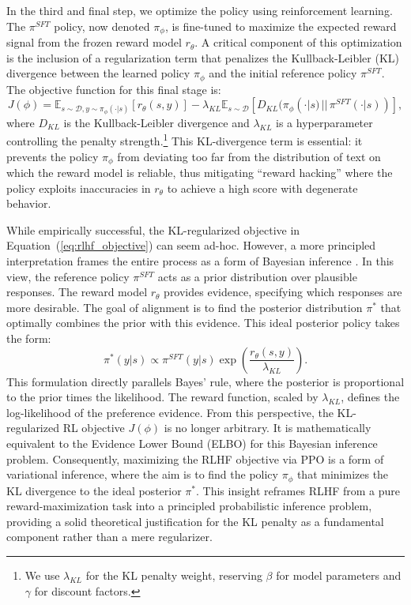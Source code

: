 In the third and final step, we optimize the policy using reinforcement learning. The $\pi^{SFT}$ policy, now denoted $\pi_\phi$, is fine-tuned to maximize the expected reward signal from the frozen reward model $r_\theta$. A critical component of this optimization is the inclusion of a regularization term that penalizes the Kullback-Leibler (KL) divergence between the learned policy $\pi_\phi$ and the initial reference policy $\pi^{SFT}$. The objective function for this final stage is:
\begin{equation}
    J(\phi) = \mathbb{E}_{s \sim \mathcal{D}, y \sim \pi_\phi(\cdot|s)} [r_\theta(s, y)] - \lambda_{KL} \mathbb{E}_{s \sim \mathcal{D}} [D_{KL}(\pi_\phi(\cdot|s) \,||\, \pi^{SFT}(\cdot|s))],
\label{eq:rlhf_objective}
\end{equation}
where $D_{KL}$ is the Kullback-Leibler divergence and $\lambda_{KL}$ is a hyperparameter controlling the penalty strength.\footnote{We use $\lambda_{KL}$ for the KL penalty weight, reserving $\beta$ for model parameters and $\gamma$ for discount factors.} This KL-divergence term is essential: it prevents the policy $\pi_\phi$ from deviating too far from the distribution of text on which the reward model is reliable, thus mitigating ``reward hacking'' where the policy exploits inaccuracies in $r_\theta$ to achieve a high score with degenerate behavior.

While empirically successful, the KL-regularized objective in Equation~(\ref{eq:rlhf_objective}) can seem ad-hoc. However, a more principled interpretation frames the entire process as a form of Bayesian inference \citep{korbak2022rl}. In this view, the reference policy $\pi^{SFT}$ acts as a prior distribution over plausible responses. The reward model $r_\theta$ provides evidence, specifying which responses are more desirable. The goal of alignment is to find the posterior distribution $\pi^*$ that optimally combines the prior with this evidence. This ideal posterior policy takes the form:
\begin{equation}
    \pi^*(y|s) \propto \pi^{SFT}(y|s) \exp\left(\frac{r_\theta(s, y)}{\lambda_{KL}}\right).
\label{eq:rlhf_posterior}
\end{equation}
This formulation directly parallels Bayes' rule, where the posterior is proportional to the prior times the likelihood. The reward function, scaled by $\lambda_{KL}$, defines the log-likelihood of the preference evidence. From this perspective, the KL-regularized RL objective $J(\phi)$ is no longer arbitrary. It is mathematically equivalent to the Evidence Lower Bound (ELBO) for this Bayesian inference problem. Consequently, maximizing the RLHF objective via PPO is a form of variational inference, where the aim is to find the policy $\pi_\phi$ that minimizes the KL divergence to the ideal posterior $\pi^*$. This insight reframes RLHF from a pure reward-maximization task into a principled probabilistic inference problem, providing a solid theoretical justification for the KL penalty as a fundamental component rather than a mere regularizer.

